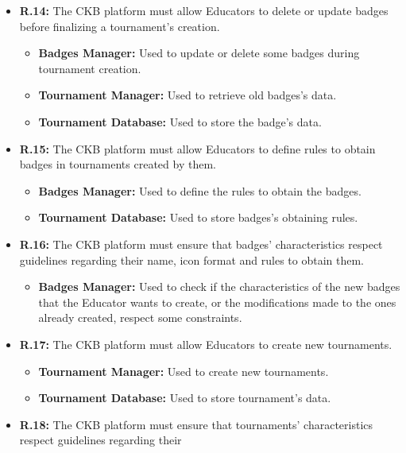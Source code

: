 \documentclass{article}
\begin{document}
{\begin{itemize}
\begin{itemize}
              given by the Educator through the manual evaluation process.  
          \end{itemize}
    \item \textbf{R.14:} The CKB platform must allow Educators to delete or update badges before finalizing a tournament's creation.
          \begin{itemize}
              \item \textbf{Badges Manager:} Used to update or delete some badges during tournament creation.
              \item \textbf{Tournament Manager:} Used to retrieve old badges's data.
              \item \textbf{Tournament Database:}  Used to store the badge's data.
          \end{itemize}
    \item \textbf{R.15:} The CKB platform must allow Educators to define rules to obtain badges in tournaments created by them.
          \begin{itemize}
              \item \textbf{Badges Manager:} Used to define the rules to obtain the badges.
              \item \textbf{Tournament Database:} Used to store badges's obtaining rules.
          \end{itemize}
    \item \textbf{R.16:} The CKB platform must ensure that badges' characteristics respect guidelines regarding their
          name, icon format and rules to obtain them.
          \begin{itemize}
              \item \textbf{Badges Manager:} Used to check if the characteristics of the new badges
              that the Educator wants to create, or the modifications made to the ones already 
              created, respect some constraints.
          \end{itemize}
    \item \textbf{R.17:} The CKB platform must allow Educators to create new tournaments.
          \begin{itemize}
              \item \textbf{Tournament Manager:} Used to create new tournaments.
              \item \textbf{Tournament Database:} Used to store tournament's data.
          \end{itemize}
    \item \textbf{R.18:} The CKB platform must ensure that tournaments' characteristics respect guidelines regarding their

\end{itemize}}
\end{document}

